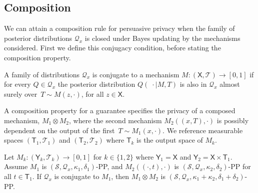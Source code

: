 \documentclass{article}
\theoremstyle{plain}
\theoremstyle{plain}
\theoremstyle{definition}
\theoremstyle{remark}
\theoremstyle{plain}
\newcommand{\cdotmid}{\;\cdot \mid}
\newcommand{\stat}{T}
\newcommand{\xset}{\mathsf{X}}
\begin{document}
\subsection{Composition}
We can attain a composition rule for persuasive privacy when the family of posterior distributions $\mathcal{Q}_x$ is closed under Bayes updating by the mechanisms considered. First we define this conjugacy condition, before stating the composition property.
\begin{definition}[Conjugacy]
    A family of distributions $\mathcal{Q}_x$ is conjugate to a mechanism $M:(\xset,\mathcal{T})\rightarrow[0,1]$ if for every $Q \in \mathcal{Q}_x$ the posterior distribution $Q(\cdotmid M, \stat)$ is also in $\mathcal{Q}_x$ almost surely over~$T \sim M(z,\cdot)$, for all $z\in \mathsf{X}$.
\end{definition}

A composition property for a guarantee specifies the privacy of a composed mechanism, $M_1 \otimes M_2$, where the second mechanism $M_2((x,T),\cdot)$ is possibly dependent on the output of the first~$T \sim M_1(x,\cdot)$. We reference measurable spaces $(\mathsf{T}_1,\mathcal{T}_1)$ and $(\mathsf{T}_2,\mathcal{T}_2)$ where $\mathsf{T}_k$ is the output space of $M_k$.

\begin{proposition}\label{prop:composition}
     Let $M_k:(\mathsf{Y}_k,\mathcal{T}_k)\rightarrow [0,1]$ for $k\in\{1,2\}$ where $\mathsf{Y}_1 = \xset$ and $\mathsf{Y}_2 = \xset \times \mathsf{T}_1$. Assume $M_1$ is $(\mathcal{S},\mathcal{Q}_x,\kappa_1,\delta_1)$-PP, and $M_2((\cdot,t),\cdot)$ is $(\mathcal{S},\mathcal{Q}_x,\kappa_2,\delta_2)$-PP for all $t \in \mathsf{T}_1$.  If $\mathcal{Q}_x$ is conjugate to $M_1$, then $M_1 \otimes M_2$ is $(\mathcal{S},\mathcal{Q}_x,\kappa_1+\kappa_2,\delta_1 + \delta_2)$-PP.
\end{proposition}
\end{document}
